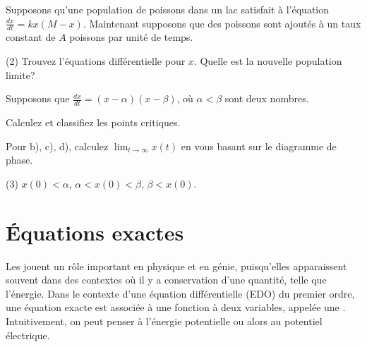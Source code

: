 \begin{exercise}
	Supposons qu'une population de poissons dans un lac satisfait à l'équation 	$\frac{dx}{dt} = kx(M-x)$.
	Maintenant supposons que des poissons sont ajoutés à un taux constant de $A$ poissons par unité de temps.
	\begin{tasks}(2)
		\task Trouvez l'équations différentielle pour $x$.
		\task Quelle est la nouvelle population limite?
	\end{tasks}
\end{exercise}

\begin{exercise}
	Supposons que $\frac{dx}{dt} = (x-\alpha)(x-\beta)$, où $\alpha <
	\beta$ sont deux nombres.
	\begin{tasks}
		\task Calculez et classifiez les points critiques.
	\end{tasks}
	Pour b), c), d), calculez $\displaystyle \lim_{t\to\infty} x(t)$ en vous basant sur le diagramme de phase.
	\begin{tasks}[resume](3)
		\task $x(0) < \alpha$,
		\task $\alpha < x(0) < \beta$,
		\task $\beta < x(0)$.
	\end{tasks}
\end{exercise}


\sectionnewpage
\section{Équations exactes}
\label{exact:section}

Les \emph{} jouent un rôle important en physique et en génie,
puisqu'elles apparaissent souvent dans des contextes où il y a conservation d'une quantité, telle que l'énergie.
Dans le contexte d'une équation différentielle (EDO) du premier ordre, une équation exacte est associée à une fonction à deux variables,
appelée une \emph{}.
Intuitivement, on peut penser à l'énergie potentielle ou alors au potentiel électrique.

